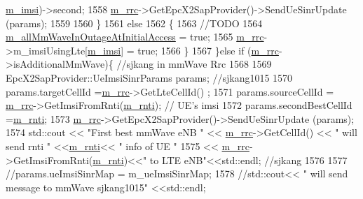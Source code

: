 \begin{DoxyCode}
      \hyperlink{classns3_1_1UeManager_a868dda076ecfc1d4202e357c16223d84}{m\_imsi})->second;
1558               \hyperlink{classns3_1_1UeManager_ab4405e9f354c66e7c1a4c95832290f5b}{m\_rrc}->GetEpcX2SapProvider()->SendUeSinrUpdate (params);
1559 
1560         \}
1561         \textcolor{keywordflow}{else}
1562         \{
1563           \textcolor{comment}{//TODO}
1564           \hyperlink{classns3_1_1UeManager_a311e1518759c74a51cbc56c568488ca1}{m\_allMmWaveInOutageAtInitialAccess} = \textcolor{keyword}{true};
1565           \hyperlink{classns3_1_1UeManager_ab4405e9f354c66e7c1a4c95832290f5b}{m\_rrc}->m\_imsiUsingLte[\hyperlink{classns3_1_1UeManager_a868dda076ecfc1d4202e357c16223d84}{m\_imsi}] = \textcolor{keyword}{true};
1566         \} 
1567       \}\textcolor{keywordflow}{else} \textcolor{keywordflow}{if} (\hyperlink{classns3_1_1UeManager_ab4405e9f354c66e7c1a4c95832290f5b}{m\_rrc}->isAdditionalMmWave)\{ \textcolor{comment}{//sjkang in mmWave Rrc}
1568 
1569                       EpcX2SapProvider::UeImsiSinrParams params; \textcolor{comment}{//sjkang1015}
1570                       params.targetCellId =\hyperlink{classns3_1_1UeManager_ab4405e9f354c66e7c1a4c95832290f5b}{m\_rrc}->GetLteCellId() ; 
1571                       params.sourceCellId = \hyperlink{classns3_1_1UeManager_ab4405e9f354c66e7c1a4c95832290f5b}{m\_rrc}->GetImsiFromRnti(\hyperlink{classns3_1_1UeManager_a5a72b4fe818f21993bd7f05d7e2c4f83}{m\_rnti}); \textcolor{comment}{// UE's imsi}
1572                       params.secondBestCellId =\hyperlink{classns3_1_1UeManager_a5a72b4fe818f21993bd7f05d7e2c4f83}{m\_rnti};
1573                       \hyperlink{classns3_1_1UeManager_ab4405e9f354c66e7c1a4c95832290f5b}{m\_rrc}->GetEpcX2SapProvider()->SendUeSinrUpdate (params);
1574                       std::cout << \textcolor{stringliteral}{"First best mmWave eNB "} << \hyperlink{classns3_1_1UeManager_ab4405e9f354c66e7c1a4c95832290f5b}{m\_rrc}->GetCellId() << \textcolor{stringliteral}{" will send rnti 
      "} <<\hyperlink{classns3_1_1UeManager_a5a72b4fe818f21993bd7f05d7e2c4f83}{m\_rnti}<< \textcolor{stringliteral}{" info of UE "}
1575                                   << \hyperlink{classns3_1_1UeManager_ab4405e9f354c66e7c1a4c95832290f5b}{m\_rrc}->GetImsiFromRnti(\hyperlink{classns3_1_1UeManager_a5a72b4fe818f21993bd7f05d7e2c4f83}{m\_rnti})<<\textcolor{stringliteral}{" to LTE eNB"}<<std::endl; \textcolor{comment}{
      //sjkang}
1576 
1577                       \textcolor{comment}{//params.ueImsiSinrMap = m\_ueImsiSinrMap;}
1578                       \textcolor{comment}{//std::cout<< " will send message to mmWave sjkang1015" <<std::endl;}

\end{DoxyCode}
